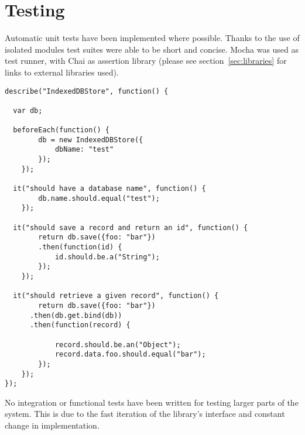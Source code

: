 \section{Testing}
\label{sec:testing}

Automatic unit tests have been implemented where possible. Thanks to the use of isolated modules test suites were able to be short and concise. Mocha was used as test runner, with Chai as assertion library (please see section~\ref{sec:libraries} for links to external libraries used).

\begin{Code}
\begin{lstlisting}[caption={Sample test suite}, label={lst:testsuite}]
describe("IndexedDBStore", function() {

  var db;

  beforeEach(function() {
		db = new IndexedDBStore({
			dbName: "test"
		});
	});

  it("should have a database name", function() {
		db.name.should.equal("test");
	});

  it("should save a record and return an id", function() {
		return db.save({foo: "bar"})
		.then(function(id) {
			id.should.be.a("String");
		});
	});

  it("should retrieve a given record", function() {
		return db.save({foo: "bar"})
      .then(db.get.bind(db))
      .then(function(record) {

			record.should.be.an("Object");
			record.data.foo.should.equal("bar");
		});
	});
});
\end{lstlisting}
\end{Code}

No integration or functional tests have been written for testing larger parts of the system. This is due to the fast iteration of the library's interface and constant change in implementation.
